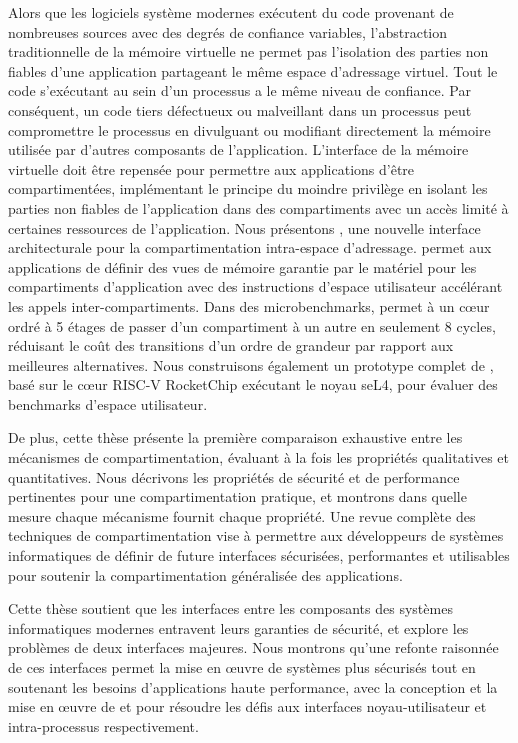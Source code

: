 Alors que les logiciels système modernes exécutent du code provenant de nombreuses sources avec des degrés de confiance variables, l'abstraction traditionnelle de la mémoire virtuelle ne permet pas l'isolation des parties non fiables d'une application partageant le même espace d'adressage virtuel. 
Tout le code s'exécutant au sein d'un processus a le même niveau de confiance. 
Par conséquent, un code tiers défectueux ou malveillant dans un processus peut compromettre le processus en divulguant ou modifiant directement la mémoire utilisée par d'autres composants de l'application. 
L'interface de la mémoire virtuelle doit être repensée pour permettre aux applications d'être compartimentées, implémentant le principe du moindre privilège en isolant les parties non fiables de l'application dans des compartiments avec un accès limité à certaines ressources de l'application. 
Nous présentons \seccells, une nouvelle interface architecturale pour la compartimentation intra-espace d'adressage. \seccells permet aux applications de définir des vues de mémoire garantie par le matériel pour les compartiments d'application avec des instructions d'espace utilisateur accélérant les appels inter-compartiments. 
Dans des microbenchmarks, \seccells permet à un cœur ordré à 5 étages de passer d'un compartiment à un autre en seulement 8 cycles, réduisant le coût des transitions d'un ordre de grandeur par rapport aux meilleures alternatives. 
Nous construisons également un prototype complet de \seccells, basé sur le cœur RISC-V RocketChip exécutant le noyau seL4, pour évaluer des benchmarks d'espace utilisateur.

De plus, cette thèse présente la première comparaison exhaustive entre les mécanismes de compartimentation, évaluant à la fois les propriétés qualitatives et quantitatives. 
Nous décrivons les propriétés de sécurité et de performance pertinentes pour une compartimentation pratique, et montrons dans quelle mesure chaque mécanisme fournit chaque propriété. 
Une revue complète des techniques de compartimentation vise à permettre aux développeurs de systèmes informatiques de définir de future interfaces sécurisées, performantes et utilisables pour soutenir la compartimentation généralisée des applications.

Cette thèse soutient que les interfaces entre les composants des systèmes informatiques modernes entravent leurs garanties de sécurité, et explore les problèmes de deux interfaces majeures. 
Nous montrons qu'une refonte raisonnée de ces interfaces permet la mise en œuvre de systèmes plus sécurisés tout en soutenant les besoins d'applications haute performance, avec la conception et la mise en œuvre de \midas et \seccells pour résoudre les défis aux interfaces noyau-utilisateur et intra-processus respectivement.